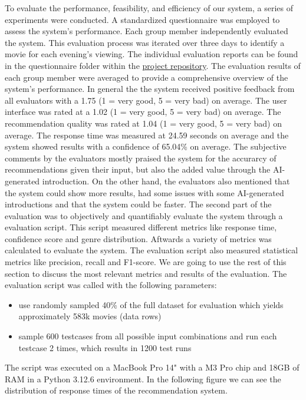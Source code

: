 \documentclass[12pt,a4paper]{article}
\begin{document}
To evaluate the performance, feasibility, and efficiency of our system, a series of experiments were conducted.
A standardized questionnaire was employed to assess the system’s performance.
Each group member independently evaluated the system.
This evaluation process was iterated over three days to identify a movie for each evening’s viewing.
The individual evaluation reports can be found in the questionnaire folder within the
\href{https://github.com/IImpaq/movie-finder/tree/4d1d66db055b5804c673e355566f92f5fbdcb28c/questionnaire}{project repository}.
The evaluation results of each group member were averaged to provide a comprehensive overview of the system’s performance.
In general the the system received positive feedback from all evaluators with a 1.75 (1 = very good, 5 = very bad) on average.
The user interface was rated at a 1.02 (1 = very good, 5 = very bad) on average.
The recommendation quality was rated at 1.04 (1 = very good, 5 = very bad) on average.
The response time was measured at 24.59 seconds on average and the system showed results with a confidence of 65.04\% on average.
The subjective comments by the evaluators mostly praised the system for the accurarcy of recommendations given their input, but also the added value through the AI-generated introduction.
On the other hand, the evaluators also mentioned that the system could show more results, had some issues with some AI-generated introductions and that the system could be faster.
\newline \noindent The second part of the evaluation was to objectively and quantifiably evaluate the system through a evaluation script.
This script measured different metrics like response time, confidence score and genre distribution.
Aftwards a variety of metrics was calculated to evaluate the system.
The evaluation script also measured statistical metrics like precision, recall and F1-score.
We are going to use the rest of this section to discuss the most relevant metrics and results of the evaluation.
The evaluation script was called with the following parameters:
\begin{itemize}
  \item use randomly sampled 40\% of the full dataset for evaluation which yields approximately 583k movies (data rows)
  \item sample 600 testcases from all possible input combinations and run each testcase 2 times, which results in 1200 test runs
\end{itemize}

\noindent The script was executed on a MacBook Pro 14" with a M3 Pro chip and 18GB of RAM in a Python 3.12.6 environment.
In the following figure we can see the distribution of response times of the recommendation system.
\end{document}
